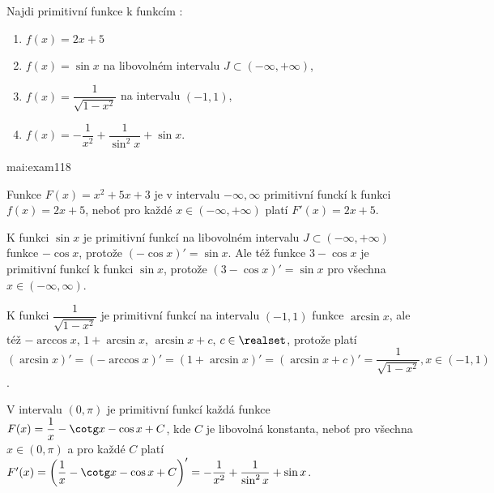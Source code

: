 \begin{mathexam}{Najdi primitivní funkce k funkcím \cite[s.~254]{Brabec1989}:
  \begin{enumerate}
    \item \(f(x) = 2x+5\)
    \item \(f(x) = \sin x\) na libovolném intervalu \(J\subset(-\infty,+\infty)\),
    \item \(f(x) = \dfrac{1}{\sqrt{1-x^2}}\) na intervalu \((-1, 1)\),
    \item \(f(x) = -\dfrac{1}{x^2} + \dfrac{1}{\sin^2x} + \sin x\).
  \end{enumerate}
}{mai:exam118}

  Funkce \(F(x) = x^2+5x+3\) je v intervalu \(-\infty, \infty\) primitivní funckí k funkci \(f(x)
  = 2x+5\), neboť pro každé \(x\in(-\infty,+\infty)\) platí \(F'(x)=2x+5\).

  K funkci \(\sin x\) je primitivní funkcí na libovolném intervalu \(J\subset(-\infty,+\infty)\) 
  funkce \(-\cos x\), protože \((-\cos x)' = \sin x\). Ale též funkce \(3-\cos x\) je primitivní 
  funkcí k funkci \(\sin x\), protože \((3 - \cos x)' = \sin x\) pro všechna \(x\in(-\infty, 
  \infty)\).

  K funkci  \(\dfrac{1}{\sqrt{1-x^2}}\) je primitivní funkcí na intervalu \((-1, 1)\) funkce
  \(\arcsin x\), ale též \(-\arccos x\), \(1 + \arcsin x\), \(\arcsin x + c\), \(c\in\realset\),
  protože platí \((\arcsin x)' = (-\arccos x)' = (1+\arcsin x)' = (\arcsin x + c)' =
  \dfrac{1}{\sqrt{1-x^2}}, x\in(-1, 1)\).

  V intervalu \((0,\pi)\) je primitivní funkcí každá funkce \(F(x) = \dfrac{1}{x}-\cotg x - \cos x
  +C\), kde \(C\) je libovolná konstanta, neboť pro všechna \(x\in(0,\pi)\) a pro každé \(C\)
  platí \(F'(x) = \left(\dfrac{1}{x}-\cotg x -\cos x +C\right)'= -\dfrac{1}{x^2} +
  \dfrac{1}{\sin^2x} + \sin x\).
\end{mathexam}
